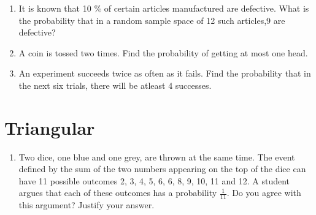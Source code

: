 \begin{enumerate}[label=\thesection.\arabic*,ref=\thesection.\theenumi]
\\
\solution

\item It is known that 10 $\%$ of certain articles manufactured are defective. What is the probability that in a random sample space of 12 such articles,9 are defective? \\
\solution

\item A coin is tossed two times. Find the probability of getting at most one head.
\\
\solution

\item An experiment succeeds twice as often as it fails. Find the probability that in the next
six trials, there will be atleast 4 successes.
\solution

    \end{enumerate}
    \section{Triangular}
\begin{enumerate}[label=\thesection.\arabic*,ref=\thesection.\theenumi]
	\item Two dice, one blue and one grey, are thrown at the same time.   The event defined by the sum of the two numbers appearing on the top of the dice can have 11 possible outcomes 2, 3, 4, 5, 6, 6, 8, 9, 10, 11 and 12.  A student argues that each of these outcomes has a probability $\frac{1}{11}$.  Do you agree with this argument?  Justify your answer.
    \end{enumerate}

